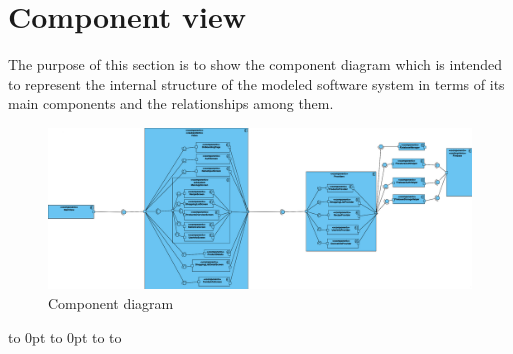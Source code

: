 \section{Component view}
The purpose of this section is to show the component diagram which is intended to represent the internal structure of the modeled software system in terms of its main components and the relationships among them.

\def\fillandplacepagenumber{%
 \par\pagestyle{empty}%
\vbox to 0pt{\vss}\vfill
\vbox to 0pt{\baselineskip0pt
   \hbox to\linewidth{\hss}%
   \setlength{\footskip}{70pt}
   \baselineskip\footskip
   \hbox to\linewidth{%
     \hfil\thepage\hfil}\vss}}

\begin{landscape}
\begin{figure}[h]
\vspace*{-2cm}
\noindent
\centering
\centerline{\includegraphics[scale = 0.37]{./Images/component.png}}
\vspace*{-1cm}
    \caption{Component diagram}
    \vspace*{-12cm}
\end{figure}
\fillandplacepagenumber
\end{landscape}




